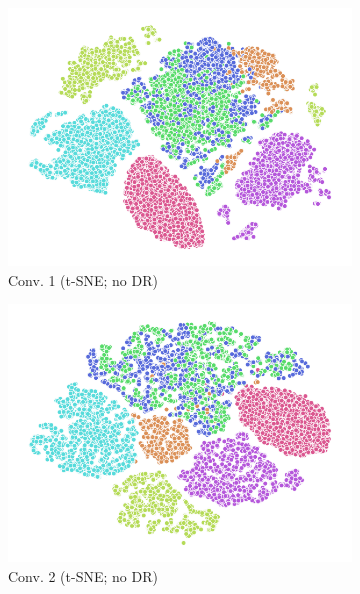 \begin{figure}
  \begin{subfigure}{0.22\textwidth}
    \includegraphics[width=\textwidth]{figures/chapter6/embeddings/jaco_no-DR_prop_conv1_tSNE.png}
    \caption{Conv. 1 (t-SNE; no DR)}
  \end{subfigure}
  \begin{subfigure}{0.22\textwidth}
    \includegraphics[width=\textwidth]{figures/chapter6/embeddings/jaco_no-DR_prop_conv2_tSNE.png}
    \caption{Conv. 2 (t-SNE; no DR)}
  \end{subfigure}
  \begin{subfigure}{0.22\textwidth}

\end{subfigure}
\end{figure}
